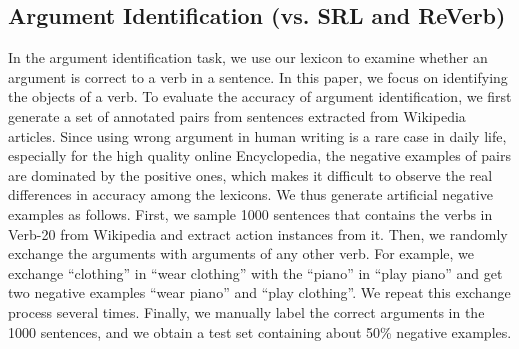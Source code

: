 \subsection{Argument Identification (vs. SRL and ReVerb)}
\label{sec:ai}
%
%
In the argument identification task, we use our lexicon to examine
whether an argument is correct to a verb in a sentence.
In this paper, we focus on identifying the objects of a verb. To evaluate
the accuracy of argument identification, we first generate a set of
annotated  pairs from sentences extracted from Wikipedia
articles. Since using wrong argument in human writing is a rare case in daily life, especially
for the high quality online Encyclopedia, the
negative examples of  pairs are dominated by the positive
ones, which makes it difficult to observe the real differences in accuracy
among the lexicons. We thus generate artificial negative examples as follows.
First, we sample 1000 sentences that contains the verbs in
Verb-20 from Wikipedia and extract action instances from it. Then, we
randomly exchange the arguments with arguments of any other verb. For
example, we exchange ``clothing'' in ``wear clothing'' with the ``piano''
in ``play piano'' and get two negative examples ``wear piano''
and ``play clothing''.
We repeat this exchange process several times. Finally, we manually
label the correct arguments in the 1000 sentences, and we obtain a test set
containing about 50\% negative examples.



